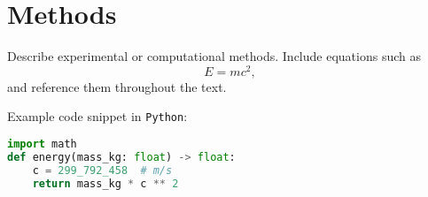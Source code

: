 \section{Methods}
\label{sec:methods}

Describe experimental or computational methods. Include equations such as
\begin{equation}
  E = mc^{2},
\end{equation}
and reference them throughout the text.

Example code snippet in \texttt{Python}:
\begin{lstlisting}[language=Python, caption={Energy--mass equivalence}]
import math
def energy(mass_kg: float) -> float:
    c = 299_792_458  # m/s
    return mass_kg * c ** 2
\end{lstlisting}
